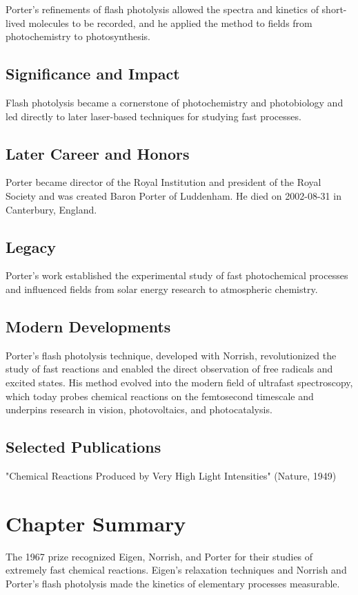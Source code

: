 Porter's refinements of flash photolysis allowed the spectra and kinetics of short-lived molecules to be recorded, and he applied the method to fields from photochemistry to photosynthesis.

\subsection*{Significance and Impact}

Flash photolysis became a cornerstone of photochemistry and photobiology and led directly to later laser-based techniques for studying fast processes.

\subsection*{Later Career and Honors}

Porter became director of the Royal Institution and president of the Royal Society and was created Baron Porter of Luddenham. He died on 2002-08-31 in Canterbury, England.

\subsection*{Legacy}

Porter's work established the experimental study of fast photochemical processes and influenced fields from solar energy research to atmospheric chemistry.

\subsection*{Modern Developments}

Porter's flash photolysis technique, developed with Norrish, revolutionized the study of fast reactions and enabled the direct observation of free radicals and excited states. His method evolved into the modern field of ultrafast spectroscopy, which today probes chemical reactions on the femtosecond timescale and underpins research in vision, photovoltaics, and photocatalysis.

\subsection*{Selected Publications}

"Chemical Reactions Produced by Very High Light Intensities" (Nature, 1949)

\clearpage

\section*{Chapter Summary}

The 1967 prize recognized Eigen, Norrish, and Porter for their studies of extremely fast chemical reactions. Eigen's relaxation techniques and Norrish and Porter's flash photolysis made the kinetics of elementary processes measurable.


